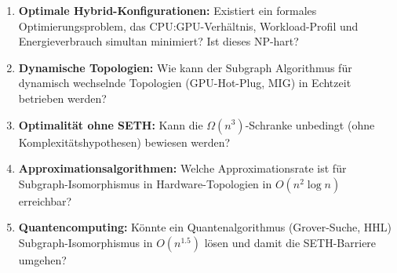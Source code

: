 ﻿\documentclass[a4paper,12pt]{article}
\theoremstyle{definition}
\begin{document}
\begin{enumerate}
  \item \textbf{Optimale Hybrid-Konfigurationen:} Existiert ein formales
        Optimierungsproblem, das CPU:GPU-Verh\"altnis, Workload-Profil und
        Energieverbrauch simultan minimiert? Ist dieses NP-hart?
  \item \textbf{Dynamische Topologien:} Wie kann der Subgraph Algorithmus
        f\"ur dynamisch wechselnde Topologien (GPU-Hot-Plug, MIG) in
        Echtzeit betrieben werden?
  \item \textbf{Optimalit\"at ohne SETH:} Kann die $\Omega(n^3)$-Schranke
        unbedingt (ohne Komplexit\"atshypothesen) bewiesen werden?
  \item \textbf{Approximationsalgorithmen:} Welche Approximationsrate ist
        f\"ur Subgraph-Isomorphismus in Hardware-Topologien in
        $O(n^2 \log n)$ erreichbar?
  \item \textbf{Quantencomputing:} K\"onnte ein Quantenalgorithmus
        (Grover-Suche, HHL) Subgraph-Isomorphismus in $O(n^{1.5})$
        l\"osen und damit die SETH-Barriere umgehen?
\end{enumerate}
\end{document}
